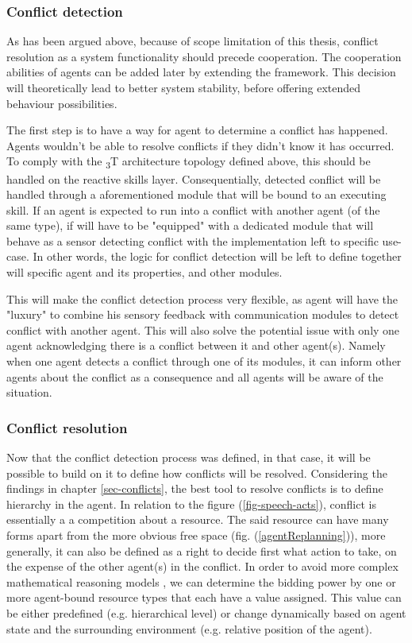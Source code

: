 \documentclass[main.tex]{subfiles}
\begin{document}
\subsubsection{Conflict detection}

As has been argued above, because of scope limitation of this thesis, 
conflict resolution as a system functionality should precede cooperation. The cooperation 
abilities of agents can be added later by extending the framework.
This decision will theoretically lead to better system stability, before offering extended
behaviour possibilities. 

The first step is to have a way for agent to determine a conflict has happened. Agents wouldn't be 
able to resolve conflicts if they didn't know it has occurred. To comply with the \textsubscript{3}T
architecture topology defined above, this should be handled on the reactive skills layer. 
Consequentially, detected conflict will be handled through a aforementioned module that will be bound 
to an executing skill. If an agent is expected to run into a conflict with another agent (of the same 
type), if will have to be "equipped" with a dedicated module that will behave as a sensor detecting conflict 
with the implementation left to specific use-case. In other words, the logic for conflict detection will be 
left to define together will specific agent and its properties, and other modules.

This will make the conflict detection process very flexible, as agent will have the "luxury" to combine
his sensory feedback with communication modules to detect conflict with another agent. This will also 
solve the potential issue with only one agent acknowledging there is a conflict between it and 
other agent(s). Namely when one agent detects a conflict through one of its modules, it can inform 
other agents about the conflict as a consequence and all agents will be aware of the situation. 


\subsubsection{Conflict resolution}

Now that the conflict detection process was defined, in that case, it will be possible to build
on it to define how conflicts will be resolved. Considering the findings in chapter
\ref{sec-conflicts}, the best tool to resolve conflicts is to define hierarchy in the agent.
In relation to the figure
(\ref{fig-speech-acts}), conflict is essentially a a competition about a resource. The said
resource can have many forms apart from the more obvious free space (fig.
(\ref{agentReplanning})), more generally, it can also be defined as a right to decide first
what action to take, on the expense of the other agent(s) in the conflict. In order to avoid
more complex mathematical reasoning models \cite{Binder2022}, we can determine the bidding
power by one or more agent-bound resource types that each have a value assigned. This value can
be either predefined (e.g. hierarchical level) or change dynamically based on agent state and
the surrounding environment (e.g. relative position of the agent). 
\end{document}
